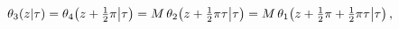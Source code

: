 \[\mathop{\theta_{3}\/}\nolimits\!\left(z\middle|\tau\right)=\mathop{\theta_{4}%
\/}\nolimits\!\left(z+\tfrac{1}{2}\pi\middle|\tau\right)=M\mathop{\theta_{2}\/%
}\nolimits\!\left(z+\tfrac{1}{2}\pi\tau\middle|\tau\right)=M\mathop{\theta_{1}%
\/}\nolimits\!\left(z+\tfrac{1}{2}\pi+\tfrac{1}{2}\pi\tau\middle|\tau\right),\]